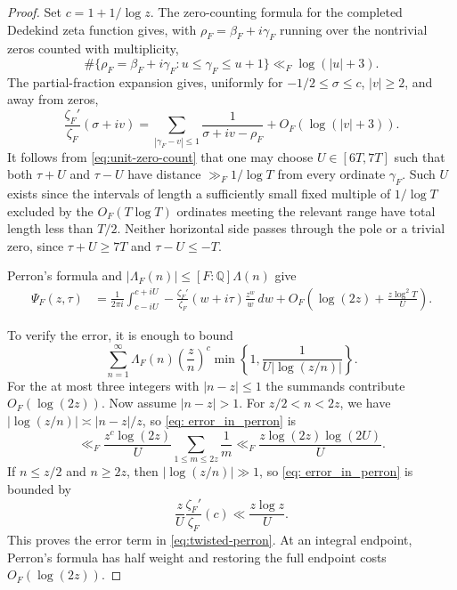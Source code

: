 \documentclass[twoside,reqno,11pt,a4paper]{amsart}
\numberwithin{equation}{section}
\theoremstyle{plain}
\theoremstyle{definition}
\theoremstyle{remark}
\renewcommand{\le}{\leqslant}
\renewcommand{\ge}{\geqslant}
\begin{document}
\begin{proof}
Set $c=1+1/\log z$.  The zero-counting formula for the completed
Dedekind zeta function gives, with $\rho_F=\beta_F+i\gamma_F$ running over
the nontrivial zeros counted with multiplicity,
\begin{equation}\label{eq:unit-zero-count}
\#\{\rho_F=\beta_F+i\gamma_F:u\le\gamma_F\le u+1\}
\ll_F\log(|u|+3).
\end{equation}
The partial-fraction expansion gives, uniformly for
$-1/2\le\sigma\le c$, $|v|\ge2$, and away from zeros,
\begin{equation}\label{eq:log-derivative-local}
\frac{\zeta_F'}{\zeta_F}(\sigma+iv)
=\sum_{|\gamma_F-v|\le1}
\frac1{\sigma+iv-\rho_F}+O_F(\log(|v|+3)).
\end{equation} 
It follows from \eqref{eq:unit-zero-count} that one may choose
$U\in[6T,7T]$ such that both $\tau+U$ and $\tau-U$ have distance
$\gg_F1/\log T$ from every ordinate $\gamma_F$.  Such $U$ exists since the intervals
of length a sufficiently small fixed multiple of $1/\log T$ excluded by
the $O_F(T\log T)$ ordinates meeting the relevant range have total length
less than $T/2$. Neither horizontal side passes through the pole or a trivial zero, since
$\tau+U\ge7T$ and $\tau-U\le-T$.

Perron's formula and
$|\Lambda_F(n)|\le[F:\mathbb Q]\Lambda(n)$ give
\begin{align}
\Psi_F(z,\tau)
&=\frac1{2\pi i}\int_{c-iU}^{c+iU}
-\frac{\zeta_F'}{\zeta_F}(w+i\tau)
\frac{z^w}{w}\,dw
+O_F\left(\log(2z)+\frac{z\log^2T}{U}\right).
\label{eq:twisted-perron}
\end{align}

To verify the error, it is enough to bound
\begin{equation}\label{eq: error_in_perron}
\sum_{n=1}^{\infty}\Lambda_F(n)\left(\frac zn\right)^c
\min\left\{1,\frac1{U|\log(z/n)|}\right\}.
\end{equation}
For the at most three integers with $|n-z|\le1$ the summands contribute $O_F(\log(2z))$. Now assume $|n-z|>1$. For $z/2<n<2z$, we have
$|\log(z/n)|\asymp|n-z|/z$, so \eqref{eq: error_in_perron} is
\begin{equation*}
\ll_F\frac{z^{c}\log(2z)}U\sum_{1\le m\le2z}\frac1m
\ll_F\frac{z\log(2z)\log(2U)}U.
\end{equation*}
If $n\le z/2$ and $n\ge2z$, then $|\log(z/n)|\gg 1$, so \eqref{eq: error_in_perron} is bounded by 
\begin{equation*}
    \frac{z}{U}\frac{\zeta_F'}{\zeta_F}(c) \ll \frac{z\log z}{U}.
\end{equation*}
 This proves the error term
in \eqref{eq:twisted-perron}.  At an integral endpoint, Perron's formula
has half weight and restoring the full endpoint costs $O_F(\log(2z))$.


\end{proof}
\end{document}
